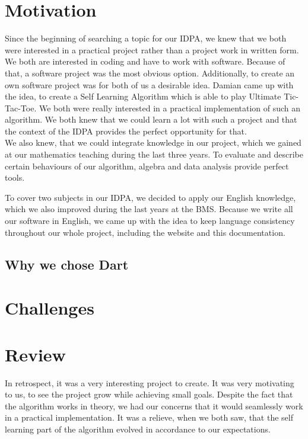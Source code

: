 \section{Motivation}
Since the beginning of searching a topic for our IDPA, we knew that we both were interested in a practical project rather than a  project work in written form. We both are interested in coding and have to work with software. Because of that, a software project was the most obvious option. Additionally, to create an own software project was for both of us a desirable idea.
Damian came up with the idea, to create a Self Learning Algorithm which is able to play Ultimate Tic-Tac-Toe. We both were really interested in a practical implementation of such an algorithm. We both knew that we could learn a lot with such a project and that the context of the IDPA provides the perfect opportunity for that. \\

We also knew, that we could integrate knowledge in our project, which we gained at our mathematics teaching during the last three years. To evaluate and describe certain behaviours of our algorithm, algebra and data analysis provide perfect tools.

To cover two subjects in our IDPA, we decided to apply our English knowledge, which we also improved during the last years at the BMS. Because we write all our software in English, we came up with the idea to keep language consistency throughout our whole project, including the website and this documentation.

\subsection{Why we chose Dart}


\section{Challenges}


\section{Review}
In retrospect, it was a very interesting project to create. It was very motivating to us, to see the project grow while achieving small goals. Despite the fact that the algorithm works in theory, we had our concerns that it would seamlessly work in a practical implementation. It was a relieve, when we both saw, that the self learning part of the algorithm evolved in accordance to our expectations.


